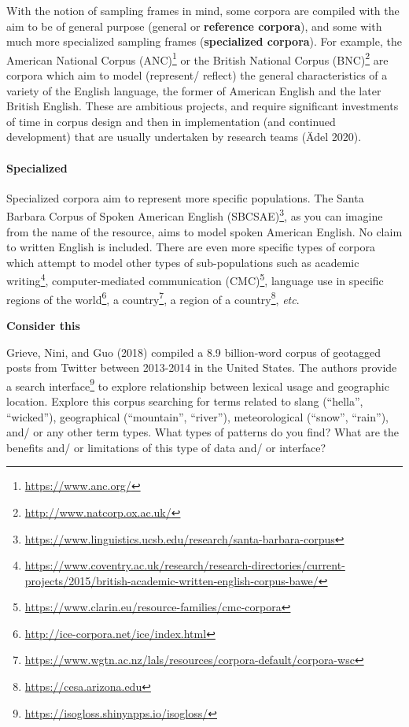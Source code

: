 \documentclass[
  letterpaper,
]{latex/krantz}
\let\oldparagraph\paragraph
\renewcommand{\paragraph}[1]{\oldparagraph{#1}\mbox{}}
\DeclareRobustCommand{\href}[2]{#2\footnote{\url{#1}}}
\begin{document}
With the notion of sampling frames in mind, some corpora are compiled
with the aim to be of general purpose (general or \textbf{reference
corpora}), and some with much more specialized sampling frames
(\textbf{specialized corpora}). For example, the
\href{https://www.anc.org/}{American National Corpus (ANC)} or the
\href{http://www.natcorp.ox.ac.uk/}{British National Corpus (BNC)} are
corpora which aim to model (represent/ reflect) the general
characteristics of a variety of the English language, the former of
American English and the later British English. These are ambitious
projects, and require significant investments of time in corpus design
and then in implementation (and continued development) that are usually
undertaken by research teams (Ädel 2020).

\hypertarget{specialized}{%
\paragraph{Specialized}\label{specialized}}

Specialized corpora aim to represent more specific populations. The
\href{https://www.linguistics.ucsb.edu/research/santa-barbara-corpus}{Santa
Barbara Corpus of Spoken American English (SBCSAE)}, as you can imagine
from the name of the resource, aims to model spoken American English. No
claim to written English is included. There are even more specific types
of corpora which attempt to model other types of sub-populations such as
\href{https://www.coventry.ac.uk/research/research-directories/current-projects/2015/british-academic-written-english-corpus-bawe/}{academic
writing},
\href{https://www.clarin.eu/resource-families/cmc-corpora}{computer-mediated
communication (CMC)}, language use in specific
\href{http://ice-corpora.net/ice/index.html}{regions of the world}, a
\href{https://www.wgtn.ac.nz/lals/resources/corpora-default/corpora-wsc}{country},
a \href{https://cesa.arizona.edu}{region of a country}, \emph{etc}.

\begin{tcolorbox}[enhanced jigsaw, left=2mm, arc=.35mm, colback=white, rightrule=.15mm, toprule=.15mm, breakable, leftrule=.75mm, opacityback=0, bottomrule=.15mm]

\textbf{ Consider this}

Grieve, Nini, and Guo (2018) compiled a 8.9 billion-word corpus of
geotagged posts from Twitter between 2013-2014 in the United States. The
authors provide a \href{https://isogloss.shinyapps.io/isogloss/}{search
interface} to explore relationship between lexical usage and geographic
location. Explore this corpus searching for terms related to slang
(``hella'', ``wicked''), geographical (``mountain'', ``river''),
meteorological (``snow'', ``rain''), and/ or any other term types. What
types of patterns do you find? What are the benefits and/ or limitations
of this type of data and/ or interface?

\end{tcolorbox}
\end{document}
